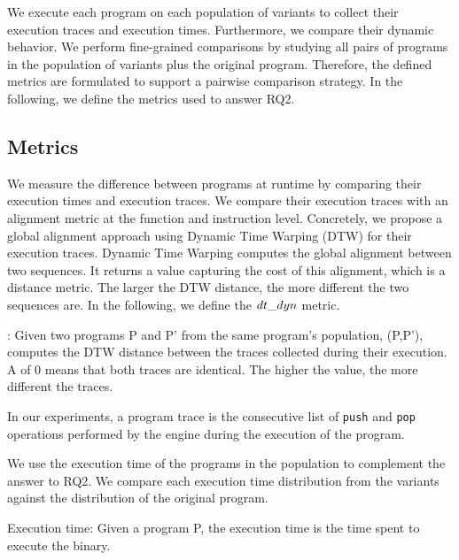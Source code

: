 We execute each program on each population of variants to collect their execution traces and execution times. Furthermore, we compare their dynamic behavior. We perform fine-grained comparisons by studying all pairs of programs in the population of variants plus the original program. Therefore, the defined metrics are formulated to support a pairwise comparison strategy.
In the following, we define the metrics used to answer RQ2.

\subsection*{Metrics}

We measure the difference between programs at runtime by comparing their execution times and execution traces. We compare their execution traces with an alignment metric at the function and instruction level. Concretely, we propose a global alignment approach using Dynamic Time Warping (DTW) for their execution traces. %
Dynamic Time Warping \cite{Maia08usinga} computes the global alignment between two sequences. It returns a value capturing the cost of this alignment, which is a distance metric. The larger the DTW distance, the more different the two sequences are.
In the following, we define the $dt\_dyn$ metric. 
 

\begin{metric}{\DTW{}:}
\label{metric:stack}
	Given two programs P and P' from the same program's population, \DTW{}(P,P'), computes the DTW distance between the traces collected during their execution. \\
	A \DTW{} of $0$ means that both traces are identical.
	The higher the value, the more different the traces. 
\end{metric}


In our experiments, a program trace is the consecutive list of \texttt{push} and \texttt{pop} operations performed by the \wasm engine during the execution of the program.

We use the execution time of the programs in the population to complement the answer to RQ2. We compare each execution time distribution from the variants against the distribution of the original program.

\begin{metric}{Execution time:}\label{metric:time}
	Given a \wasm program P, the execution time is the time spent to execute the binary.
\end{metric}


